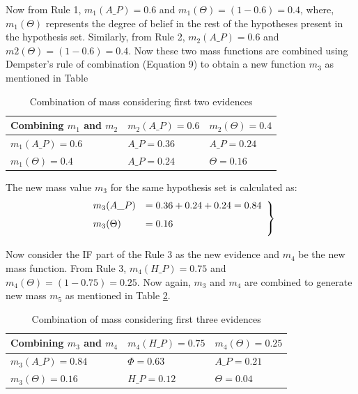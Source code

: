 \documentclass{elsarticle}
\begin{document}
Now from Rule 1, $m_1(A\_P)=0.6$ and $m_1(\Theta)=(1-0.6)=0.4$, where, $m_1(\Theta)$ represents the degree of belief in 
the rest of the hypotheses present in the hypothesis set. Similarly, from Rule 2, $m_2(A\_P)=0.6$ and 
$m2(\Theta)=(1-0.6)=0.4$. Now these two mass functions are combined using Dempster's rule of combination (Equation 9) 
to obtain a new function $m_3$ as mentioned in Table 

\begin{table}[h]
	\small
\caption{Combination of mass considering first two evidences}
\begin{center}
\label{tab:MCF1}
\begin{tabular}{ | >{\centering\arraybackslash}m{4cm} | >{\centering\arraybackslash}m{3.25cm} | >{\centering\arraybackslash}m{3.25cm} |}
\hline
Combining $m_1$ and $m_2$ & $m_2(A\_P)=0.6$ & $m_2(\Theta)=0.4$\\
\hline
$m_1(A\_P)=0.6$ & $A\_P=0.36$ & $ A\_P=0.24$\\
\hline
$m_1(\Theta)=0.4$ & $A\_P=0.24$ & $\Theta=0.16$\\
\hline
\end{tabular}
\end{center}
\end{table}      

The new mass value $m_3$ for the same hypothesis set is calculated as:
\begin{equation}
\begin{aligned}
\left. \begin{array}{ll}
\vspace{0.25cm}
m_3 (A\_P)&={0.36+0.24+0.24}=0.84\\
\vspace{0.25cm}
m_3(\Theta)&=0.16
\end{array}\right\}
\end {aligned}
\end{equation}

Now consider the IF part of the Rule 3 as the new evidence and $m_4$ be the new mass function.
From Rule 3, $m_4(H\_P)=0.75$ and $m_4(\Theta)=(1-0.75)=0.25$. Now again, $m_3$ and $m_4$ are combined to generate new mass $m_5$ as mentioned in Table \ref{tab:MCF2}. 
\begin{table}[h]
	\small
\caption{Combination of mass considering first three evidences}
\begin{center}
\label{tab:MCF2}
\begin{tabular}{ | >{\centering\arraybackslash}m{4cm} | >{\centering\arraybackslash}m{3.25cm} | >{\centering\arraybackslash}m{3.25cm} |}
\hline
Combining $m_3$ and $m_4$ & $m_4(H\_P)=0.75$ & $m_4(\Theta)=0.25$\\
\hline
$m_3(A\_P)=0.84$ & $\Phi=0.63$ & $A\_P=0.21$\\
\hline
$m_3(\Theta)=0.16$ & $H\_P=0.12$ & $\Theta=0.04$\\
\hline
\end{tabular}
\end{center}
\end{table}
\end{document}
